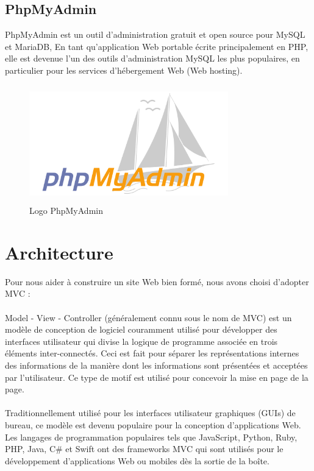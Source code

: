 \documentclass[12pt]{report}
\begin{document}
\subsection{PhpMyAdmin}

PhpMyAdmin est un outil d'administration gratuit et open source pour MySQL et MariaDB, En tant qu'application Web portable écrite principalement en PHP, elle est devenue l'un des outils d'administration MySQL les plus populaires, en particulier pour les services d'hébergement Web (Web hosting).

\vspace{0.2in}

\begin{figure}[h]
\centering
    \includegraphics[width = 3.4in, height = 2in]{../Images/PhpMyAdmin.png}
\caption{Logo PhpMyAdmin}
\end{figure}

\newpage

\section{Architecture}

Pour nous aider à construire un site Web bien formé, nous avons choisi d'adopter MVC :
\\\\
Model - View - Controller (généralement connu sous le nom de MVC) est un modèle de conception de logiciel couramment utilisé pour développer des interfaces utilisateur qui divise la logique de programme associée en trois éléments inter-connectés. Ceci est fait pour séparer les représentations internes des informations de la manière dont les informations sont présentées et acceptées par l'utilisateur. Ce type de motif est utilisé pour concevoir la mise en page de la page.
\\\\
Traditionnellement utilisé pour les interfaces utilisateur graphiques (GUIs) de bureau, ce modèle est devenu populaire pour la conception d'applications Web. Les langages de programmation populaires tels que JavaScript, Python, Ruby, PHP, Java, C\# et Swift ont des frameworks MVC qui sont utilisés pour le développement d'applications Web ou mobiles dès la sortie de la boîte.
\end{document}
